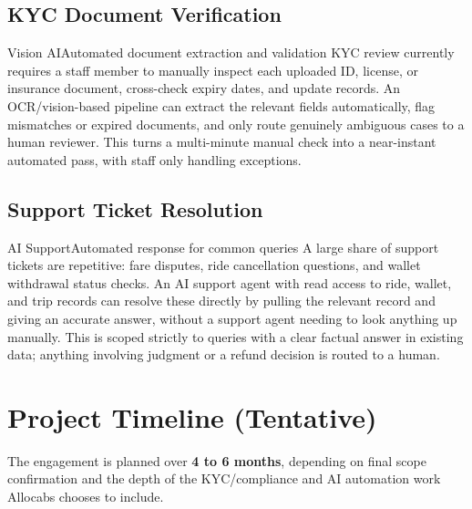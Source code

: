 \documentclass[11pt,a4paper]{article}
\begin{document}
\subsection{KYC Document Verification}
\begin{recbox}{Vision AI}{Automated document extraction and validation}
KYC review currently requires a staff member to manually inspect each uploaded ID, license, or insurance document, cross-check expiry dates, and update records. An OCR/vision-based pipeline can extract the relevant fields automatically, flag mismatches or expired documents, and only route genuinely ambiguous cases to a human reviewer. This turns a multi-minute manual check into a near-instant automated pass, with staff only handling exceptions.
\end{recbox}

\subsection{Support Ticket Resolution}
\begin{recbox}{AI Support}{Automated response for common queries}
A large share of support tickets are repetitive: fare disputes, ride cancellation questions, and wallet withdrawal status checks. An AI support agent with read access to ride, wallet, and trip records can resolve these directly by pulling the relevant record and giving an accurate answer, without a support agent needing to look anything up manually. This is scoped strictly to queries with a clear factual answer in existing data; anything involving judgment or a refund decision is routed to a human.
\end{recbox}

\section{Project Timeline (Tentative)}
The engagement is planned over \textbf{4 to 6 months}, depending on final scope confirmation and the depth of the KYC/compliance and AI automation work Allocabs chooses to include.
\end{document}
